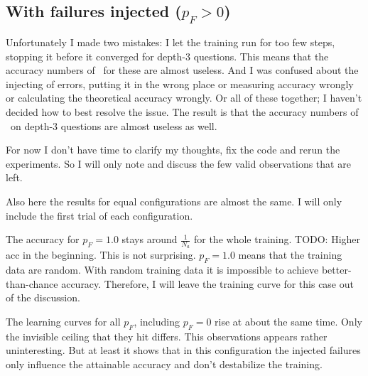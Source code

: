 \documentclass{farlamp}
\begin{document}
\subsection{With failures injected ($p_F > 0$)}

Unfortunately I made two mistakes: I let the training run for too few steps,
stopping it before it converged for depth-3 questions. This means that the
accuracy numbers of \Xpa\ for these are almost useless. And I was confused about
the injecting of errors, putting it in the wrong place or measuring accuracy
wrongly or calculating the theoretical accuracy wrongly. Or all of these
together; I haven't decided how to best resolve the issue. The result is that
the accuracy numbers of \AmpHp\ on depth-3 questions are almost useless as well.

For now I don't have time to clarify my thoughts, fix the code and rerun the
experiments. So I will only note and discuss the few valid observations that are
left.

\begin{LCRow}
\Obs Also here the results for equal configurations are almost the same.
\Disc I will only include the first trial of each configuration.
\end{LCRow}

\Obs The accuracy for $p_F = 1.0$ stays around $\frac{1}{N_a}$ for the whole
training.
TODO: Higher acc in the beginning.
\Disc This is not surprising. $p_F = 1.0$ means that the training data are
random. With random training data it is impossible to achieve better-than-chance
accuracy. Therefore, I will leave the training curve for this case out of the
discussion.

\begin{LCRow}
\Obs The learning curves for all $p_F$, including $p_F = 0$ rise at about the
same time. Only the invisible ceiling that they hit differs.
\Disc This observations appears rather uninteresting. But at least it shows that
in this configuration the injected failures only influence the attainable
accuracy and don't destabilize the training.
\end{LCRow}
\end{document}
